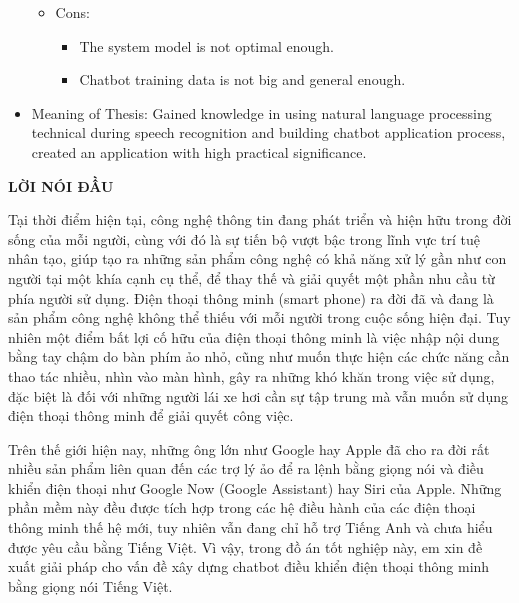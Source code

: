 \documentclass[12pt]{report}
\begin{document}
\begin{itemize}
\begin{itemize}
\begin{itemize}
		\end{itemize}
		\item Cons:
		\begin{itemize}
			\item The system model is not optimal enough.
			\item Chatbot training data is not big and general enough.
		\end{itemize}
	\end{itemize}
	\item Meaning of Thesis: Gained knowledge in using natural language processing technical during speech recognition and building chatbot application process, created an application with high practical significance.
\end{itemize}

\newpage
\tableofcontents

\newpage
\listoffigures
{}

\newpage
\listoftables
{}

\newpage
\lstlistoflistings
{}

\newpage
\begin{center}
{\large \textbf{LỜI NÓI ĐẦU}}
\end{center}
Tại thời điểm hiện tại, công nghệ thông tin đang phát triển và hiện hữu trong đời sống của mỗi người, cùng với đó là sự tiến bộ vượt bậc trong lĩnh vực trí tuệ nhân tạo, giúp tạo ra những sản phẩm công nghệ có khả năng xử lý gần như con người tại một khía cạnh cụ thể, để thay thế và giải quyết một phần nhu cầu từ phía người sử dụng. Điện thoại thông minh (smart phone) ra đời đã và đang là sản phẩm công nghệ không thể thiếu với mỗi người trong cuộc sống hiện đại. Tuy nhiên một điểm bất lợi cố hữu của điện thoại thông minh là việc nhập nội dung bằng tay chậm do bàn phím ảo nhỏ, cũng như muốn thực hiện các chức năng cần thao tác nhiều, nhìn vào màn hình, gây ra những khó khăn trong việc sử dụng, đặc biệt là đối với những người lái xe hơi cần sự tập trung mà vẫn muốn sử dụng điện thoại thông minh để giải quyết công việc.

Trên thế giới hiện nay, những ông lớn như Google hay Apple đã cho ra đời rất nhiều sản phẩm liên quan đến các trợ lý ảo để ra lệnh bằng giọng nói và điều khiển điện thoại như Google Now (Google Assistant) hay Siri của Apple. Những phần mềm này đều được tích hợp trong các hệ điều hành của các điện thoại thông minh thế hệ mới, tuy nhiên vẫn đang chỉ hỗ trợ Tiếng Anh và chưa hiểu được yêu cầu bằng Tiếng Việt. Vì vậy, trong đồ án tốt nghiệp này, em xin đề xuất giải pháp cho vấn đề xây dựng chatbot điều khiển điện thoại thông minh bằng giọng nói Tiếng Việt.
\end{document}

